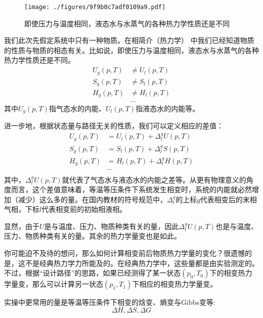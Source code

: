 
\begin{issues}
\issueDraft
{}
\end{issues}


\begin{figure}[ht]
\centering
\texttt{[image: ./figures/9f9b0c7adf0109a9.pdf]}
\caption{即使压力与温度相同，液态水与水蒸气的各种热力学性质还是不同} \label{fig_PTTVC2_1}
\end{figure}

我们此次先假定系统中只有一种物质。在相简介（热力学） 中我们已经知道物质的性质与物质的相态有关。比如说，即使压力与温度相同，液态水与水蒸气的各种热力学性质还是不同。
$$
\begin{aligned}
U_g(p,T) &\ne U_l(p,T)\\
S_g(p,T) &\ne S_l(p,T)\\
H_g(p,T) &\ne H_l(p,T)\\
&...
\end{aligned}
$$
其中$U_g(p,T)$指气态水的内能、$U_l(p,T)$指液态水的内能等。

进一步地，根据状态量与路径无关的性质，我们可以定义相应的差值：
$$
\begin{aligned}
U_g(p,T) &= U_l(p,T) + \Delta ^ g_l U (p,T)\\
S_g(p,T) &= S_l(p,T) + \Delta ^ g_l S (p,T)\\
H_g(p,T) &= H_l(p,T) + \Delta ^ g_l H (p,T)\\
&...\\
\end{aligned}
$$
其中，$\Delta ^ g_l U (p,T)$就代表了气态水与液态水的内能之差等。从更有物理意义的角度而言，这个差值意味着，等温等压条件下系统发生相变时，系统的内能就必然增加（减少）这么多的量。在国内教材的符号规范中，$\Delta^g_l$的上标$g$代表相变后的末相气相，下标$l$代表相变前的初始相液相。

显然，由于$U$是与温度、压力、物质种类有关的量，因此$\Delta ^ g_l U (p,T)$也是与温度、压力、物质种类有关的量。其余的热力学量变也是如此。

你可能迫不及待的想问，那么如何计算相变前后物质热力学量的变化？很遗憾的是，这不是经典热力学力所能及的。在经典热力学中，这些量都是由实验测定的。不过，根据“设计路径”的思路，如果已经测得了某一状态$(p_0,T_0)$下的相变热力学量变，那么可以计算另一状态$(p_1,T_1)$下相应的相变热力学量变。

实操中更常用的量是等温等压条件下相变的焓变、熵变与Gibbs变等:
$$
\Delta H, \Delta  S, \Delta G
$$

